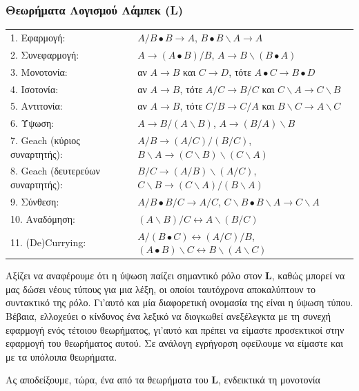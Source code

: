 \documentclass [a4paper,11pt] {book}
\theoremstyle{definition}
\theoremstyle{definition}
\newenvironment{remark}[1][Παρατήρηση]{\begin{trivlist}
\item[\hskip \labelsep {\bfseries #1}]}{\end{trivlist}}
\begin{document}
\subsubsection{Θεωρήματα Λογισμού Λάμπεκ (\textbf{L})}
\label{L-theorems}
\begin{tabular}{ll}
1. Εφαρμογή\index{εφαρμογή}: & $A/B \bullet B \to A$, $B\bullet B\backslash A\to A$\\
2. Συνεφαρμογή\index{συνεφαρμογή}: & $A\to (A \bullet B)/B$, $A\to B\backslash (B\bullet A)$ \\
3. Μονοτονία\index{μονοτονία}: & αν $A\to B$ και $C\to D$, τότε $A\bullet C \to B\bullet D$ \\
4. Ισοτονία\index{ισοτονία}: & αν $A\to B$, τότε $A/C \to B/C$ και $C\backslash A\to C\backslash B$\\
5. Αντιτονία\index{αντιτονία}: & αν $A\to B$, τότε $C/B\to C/A$ και $B\backslash C\to A\backslash C$\\
6. Ύψωση\index{ύψωση (τύπου)}: & $A \to B/(A\backslash B)$, $A\to (B/A)\backslash B$\\
7. Geach (κύριος συναρτητής): & $A/B \to (A/C)/(B/C)$, $B\backslash A \to (C\backslash B)\backslash (C\backslash A)$\\
8. Geach (δευτερεύων συναρτητής): & $B/C \to (A/B)\backslash (A/C)$, $C \backslash B \to (C\backslash A)/(B\backslash A)$ \\
9. Σύνθεση\index{σύνθεση}: & $A/B \bullet B/C \to A/C$, $C\backslash B \bullet B\backslash A \to C\backslash A$ \\
10. Αναδόμηση\index{αναδόμηση}: & $(A\backslash B)/C \leftrightarrow A\backslash (B/C)$ \\
11. (De)Currying\index{currying!(de)currying}: & $A/(B\bullet C) \leftrightarrow (A/C)/B$, $(A\bullet B) \backslash C \leftrightarrow B\backslash (A\backslash C)$
\end{tabular}
\begin{remark}
Αξίζει να αναφέρουμε ότι η ύψωση παίζει σημαντικό ρόλο στον \textbf{L}, καθώς μπορεί να μας δώσει νέους τύπους για μια λέξη, οι οποίοι ταυτόχρονα αποκαλύπτουν το συντακτικό της ρόλο. Γι'αυτό και μία διαφορετική ονομασία της είναι η ύψωση τύπου. Βέβαια, ελλοχεύει ο κίνδυνος ένα λεξικό να διογκωθεί ανεξέλεγκτα με τη συνεχή εφαρμογή ενός τέτοιου θεωρήματος, γι'αυτό και πρέπει να είμαστε προσεκτικοί στην εφαρμογή του θεωρήματος αυτού. Σε ανάλογη εγρήγορση οφείλουμε να είμαστε και με τα υπόλοιπα θεωρήματα.
\end{remark}
Ας αποδείξουμε, τώρα, ένα από τα θεωρήματα του \textbf{L}, ενδεικτικά τη μονοτονία
\end{document}
